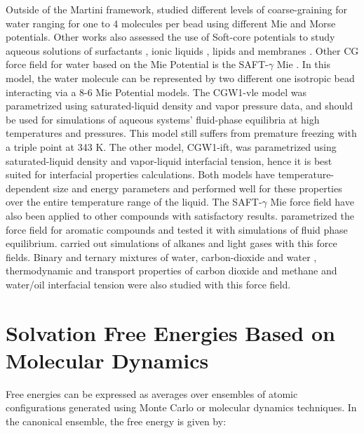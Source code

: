 Outside of the Martini framework,  studied different levels of coarse-graining for water ranging for one to 4 molecules per bead using different Mie and Morse potentials. Other works also assessed the use of Soft-core potentials to study aqueous solutions of surfactants \cite{shinoda2007}, ionic liquids \cite{bhargava2009}, lipids \cite{shinoda20102} and membranes \cite{pantano2009}. Other CG force field for water based on the Mie Potential is the SAFT-$\gamma$ Mie \cite{lobanova2015}. In this model, the water molecule can be represented by two different one isotropic bead interacting via a 8-6 Mie Potential models. The CGW1-vle model was parametrized using saturated-liquid density and vapor pressure data, and should be used for simulations of aqueous systems' fluid-phase equilibria at high temperatures and pressures. This model still suffers from premature freezing with a triple point at 343 K. The other model, CGW1-ift, was parametrized using saturated-liquid density and vapor-liquid interfacial tension, hence it is best suited for interfacial properties calculations. Both models have temperature-dependent size and energy parameters and performed well for these properties over the entire temperature range of the liquid. The SAFT-$\gamma$ Mie force field have also been applied to other compounds with satisfactory results.  parametrized the force field for aromatic compounds and tested it with simulations of fluid phase equilibrium.  carried out simulations of alkanes and light gases with this force fields. Binary and ternary mixtures of water, carbon-dioxide and water \cite{lobanova2016}, thermodynamic and transport properties of carbon dioxide and methane \cite{cassiano1,cassiano2} and water/oil interfacial tension \cite{herdes2017} were also studied with this force field.   



\section{Solvation Free Energies Based on Molecular Dynamics}

Free energies can be expressed as averages over ensembles of atomic configurations generated using Monte Carlo or molecular dynamics techniques. In the canonical ensemble, the free energy is given by:  

